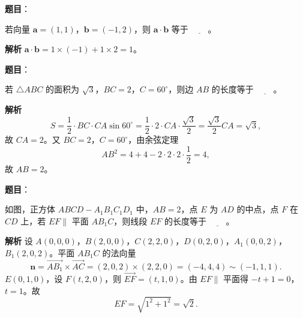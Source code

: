 \begin{answer}

\textbf{题目}：

若向量 $\boldsymbol a=(1,1)$，$\boldsymbol b=(-1,2)$，则 $\boldsymbol a\cdot\boldsymbol b$ 等于 $\underline{\qquad}$。

\textbf{解析}
$\boldsymbol a\cdot\boldsymbol b=1\times(-1)+1\times2=1$。


\end{answer}
\begin{answer}

\textbf{题目}：

若 $\triangle ABC$ 的面积为 $\sqrt3$，$BC=2$，$C=60^\circ$，则边 $AB$ 的长度等于 $\underline{\qquad}$。

\textbf{解析}
\nopagebreak[4]
\[S=\frac12\cdot BC\cdot CA\sin60^\circ=\frac12\cdot2\cdot CA\cdot\frac{\sqrt3}2=\frac{\sqrt3}2CA=\sqrt3,\]
故 $CA=2$。又 $BC=2$，$C=60^\circ$，由余弦定理
\nopagebreak[4]
\[AB^2=4+4-2\cdot2\cdot2\cdot\frac12=4,\]
故 $AB=2$。


\end{answer}
\begin{answer}

\textbf{题目}：

如图，正方体 $ABCD-A_1B_1C_1D_1$ 中，$AB=2$，点 $E$ 为 $AD$ 的中点，点 $F$ 在 $CD$ 上，若 $EF\parallel$ 平面 $AB_1C$，则线段 $EF$ 的长度等于 $\underline{\qquad}$。
\nopagebreak[4]
\begin{center}\end{center}
\nopagebreak[4]
\textbf{解析}
设 $A(0,0,0)$，$B(2,0,0)$，$C(2,2,0)$，$D(0,2,0)$，$A_1(0,0,2)$，$B_1(2,0,2)$。平面 $AB_1C$ 的法向量
\nopagebreak[4]
\[\boldsymbol n=\overrightarrow{AB_1}\times\overrightarrow{AC}=(2,0,2)\times(2,2,0)=(-4,4,4)\sim(-1,1,1).\]
$E(0,1,0)$，设 $F(t,2,0)$，则 $\overrightarrow{EF}=(t,1,0)$。由 $EF\parallel$ 平面得 $-t+1=0$，$t=1$。故
\nopagebreak[4]
\[EF=\sqrt{1^2+1^2}=\sqrt2.\]


\end{answer}
